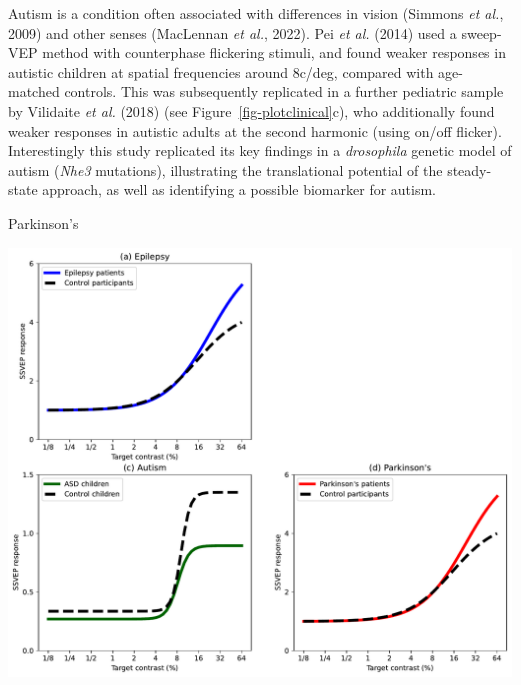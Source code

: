 \documentclass[
  letterpaper,
  DIV=11,
  numbers=noendperiod]{scrartcl}
\begin{document}
Autism is a condition often associated with differences in vision
(Simmons \emph{et al.}, 2009) and other senses (MacLennan \emph{et al.},
2022). Pei \emph{et al.} (2014) used a sweep-VEP method with
counterphase flickering stimuli, and found weaker responses in autistic
children at spatial frequencies around 8c/deg, compared with age-matched
controls. This was subsequently replicated in a further pediatric sample
by Vilidaite \emph{et al.} (2018) (see Figure~\ref{fig-plotclinical}c),
who additionally found weaker responses in autistic adults at the second
harmonic (using on/off flicker). Interestingly this study replicated its
key findings in a \emph{drosophila} genetic model of autism (\emph{Nhe3}
mutations), illustrating the translational potential of the steady-state
approach, as well as identifying a possible biomarker for autism.

Parkinson's

\includegraphics{review_files/figure-pdf/cell-8-output-1.pdf}
\end{document}
